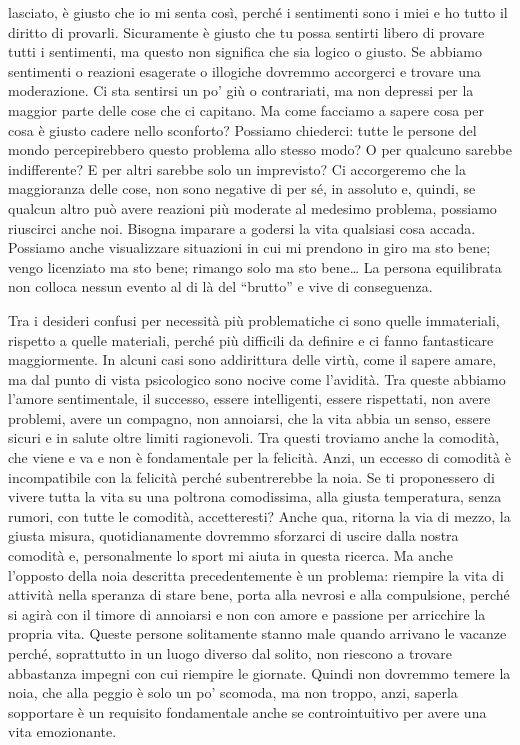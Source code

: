 \documentclass[12pt]{book} %
\begin{document}
lasciato, è giusto che io mi senta così, perché i sentimenti sono i miei e ho tutto il diritto di provarli. Sicuramente
è giusto che tu possa sentirti libero di provare tutti i sentimenti, ma questo non significa che sia logico o giusto.
Se abbiamo sentimenti o reazioni esagerate o illogiche dovremmo accorgerci e trovare una moderazione. Ci sta sentirsi
un po' giù o contrariati, ma non depressi per la maggior parte delle cose che ci capitano. Ma come
facciamo a sapere cosa per cosa è giusto cadere nello sconforto? Possiamo chiederci: tutte le persone del mondo
percepirebbero questo problema allo stesso modo? O per qualcuno sarebbe indifferente? E per altri sarebbe solo un
imprevisto? Ci accorgeremo che la maggioranza delle cose, non sono negative di per sé, in assoluto e, quindi,
se qualcun altro può avere reazioni più moderate al medesimo problema, possiamo riuscirci anche noi. Bisogna imparare a
godersi la vita qualsiasi cosa accada. Possiamo anche visualizzare situazioni in cui mi prendono in giro ma sto bene;
vengo licenziato ma sto bene; rimango solo ma sto bene… La persona equilibrata non colloca nessun evento al di là del
“brutto” e vive di conseguenza.

Tra i desideri confusi per necessità più problematiche ci sono quelle immateriali, rispetto a quelle materiali, perché
più difficili da definire e ci fanno fantasticare maggiormente. In alcuni casi sono addirittura delle virtù, come il
sapere amare, ma dal punto di vista psicologico sono nocive come l'avidità. Tra queste abbiamo
l'amore sentimentale, il successo, essere intelligenti, essere rispettati, non avere problemi,
avere un compagno, non annoiarsi, che la vita abbia un senso, essere sicuri e in salute oltre limiti ragionevoli. Tra
questi troviamo anche la comodità, che viene e va e non è fondamentale per la felicità. Anzi, un eccesso di comodità è
incompatibile con la felicità perché subentrerebbe la noia. Se ti proponessero di vivere tutta la vita su una poltrona
comodissima, alla giusta temperatura, senza rumori, con tutte le comodità, accetteresti? Anche qua, ritorna la via di
mezzo, la giusta misura, quotidianamente dovremmo sforzarci di uscire dalla nostra comodità e, personalmente lo sport
mi aiuta in questa ricerca. Ma anche l'opposto della noia descritta precedentemente è un problema:
riempire la vita di attività nella speranza di stare bene, porta alla nevrosi e alla compulsione, perché si agirà con
il timore di annoiarsi e non con amore e passione per arricchire la propria vita. Queste persone solitamente stanno
male quando arrivano le vacanze perché, soprattutto in un luogo diverso dal solito, non riescono a trovare abbastanza
impegni con cui riempire le giornate. Quindi non dovremmo temere la noia, che alla peggio è solo un
po' scomoda, ma non troppo, anzi, saperla sopportare è un requisito fondamentale anche se
controintuitivo per avere una vita emozionante.
\end{document}

